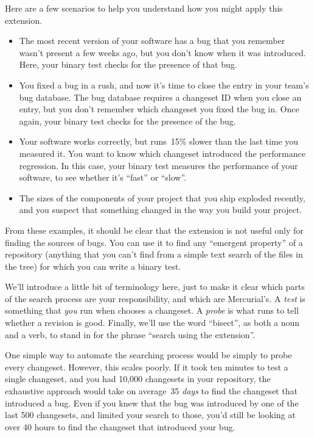 Here are a few scenarios to help you understand how you might apply this
extension.
\begin{itemize}
\item The most recent version of your software has a bug that you
  remember wasn't present a few weeks ago, but you don't know when it
  was introduced.  Here, your binary test checks for the presence of
  that bug.
\item You fixed a bug in a rush, and now it's time to close the entry
  in your team's bug database.  The bug database requires a changeset
  ID when you close an entry, but you don't remember which changeset
  you fixed the bug in.  Once again, your binary test checks for the
  presence of the bug.
\item Your software works correctly, but runs~15\% slower than the
  last time you measured it.  You want to know which changeset
  introduced the performance regression.  In this case, your binary
  test measures the performance of your software, to see whether it's
  ``fast'' or ``slow''.
\item The sizes of the components of your project that you ship
  exploded recently, and you suspect that something changed in the way
  you build your project.
\end{itemize}

From these examples, it should be clear that the 
extension is not useful only for finding the sources of bugs.  You can
use it to find any ``emergent property'' of a repository (anything
that you can't find from a simple text search of the files in the
tree) for which you can write a binary test.

We'll introduce a little bit of terminology here, just to make it
clear which parts of the search process are your responsibility, and
which are Mercurial's.  A \emph{test} is something that \emph{you} run
when  chooses a changeset.  A \emph{probe} is what
 runs to tell whether a revision is good.  Finally,
we'll use the word ``bisect'', as both a noun and a verb, to stand in
for the phrase ``search using the  extension''.

One simple way to automate the searching process would be simply to
probe every changeset.  However, this scales poorly.  If it took ten
minutes to test a single changeset, and you had 10,000 changesets in
your repository, the exhaustive approach would take on average~35
\emph{days} to find the changeset that introduced a bug.  Even if you
knew that the bug was introduced by one of the last 500 changesets,
and limited your search to those, you'd still be looking at over 40
hours to find the changeset that introduced your bug.

